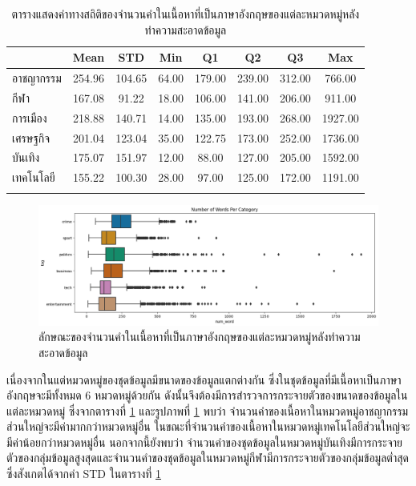 \documentclass[12pt,oneside,openright,a4paper]{cpe-thai-project}
\begin{document}
\begin{itemize}
        \begin{longtable}[!ht]{lccccccc}
          \caption{ตารางแสดงค่าทางสถิติของจำนวนคำในเนื้อหาที่เป็นภาษาอังกฤษของแต่ละหมวดหมู่หลังทําความสะอาดข้อมูล}
          \label{tbl:eng_stat}\\
          \hhline{========}
          \multicolumn{1}{c}{\textbf{หมวดหมู่}} & \textbf{Mean} & \textbf{STD} & \textbf{Min} & \textbf{Q1} & \textbf{Q2} & \textbf{Q3} & \textbf{Max}\\ \hline
          \endhead
          อาชญากรรม    & 254.96 & 104.65 & 64.00 & 179.00 & 239.00 & 312.00 & 766.00  \\ %
          กีฬา          & 167.08 & 91.22  & 18.00 & 106.00 & 141.00 & 206.00 & 911.00  \\ %
          การเมือง       & 218.88 & 140.71 & 14.00 & 135.00 & 193.00 & 268.00 & 1927.00  \\ %
          เศรษฐกิจ         & 201.04 & 123.04  & 35.00 & 122.75 & 173.00 & 252.00 & 1736.00  \\ %
          บันเทิง        & 175.07 & 151.97 & 12.00 & 88.00 & 127.00 & 205.00 & 1592.00  \\ %
          เทคโนโลยี     & 155.22 & 100.30 & 28.00 & 97.00 & 125.00 & 172.00 & 1191.00  \\ \hhline{========}
        \end{longtable}
        \begin{figure}[!ht]\centering
          \includegraphics[width=\textwidth]{./img/eng_stat/boxplot_tag.png}
          \caption{ลักษณะของจำนวนคำในเนื้อหาที่เป็นภาษาอังกฤษของแต่ละหมวดหมู่หลังทําความสะอาดข้อมูล}\label{fig:eng_boxplot}
        \end{figure}
        \newpage
        \hspace{1cm}เนื่องจากในแต่หมวดหมู่ของชุดข้อมูลมีขนาดของข้อมูลแตกต่างกัน ซึ่งในชุดข้อมูลที่มีเนื้อหาเป็นภาษาอังกฤษจะมีทั้งหมด 6 หมวดหมู่ด้วยกัน
        ดังนั้นจึงต้องมีการสำรวจการกระจายตัวของขนาดของข้อมูลในแต่ละหมวดหมู่ ซึ่งจากตารางที่ \ref{tbl:eng_stat} และรูปภาพที่ \ref{fig:eng_boxplot}
        พบว่า จำนวนคำของเนื้อหาในหมวดหมู่อาชญากรรมส่วนใหญ่จะมีค่ามากกว่าหมวดหมู่อื่น ในขณะที่จำนวนคำของเนื้อหาในหมวดหมู่เทคโนโลยีส่วนใหญ่จะมีค่าน้อยกว่าหมวดหมู่อื่น
        นอกจากนี้ยังพบว่า จำนวนคำของชุดข้อมูลในหมวดหมู่บันเทิงมีการกระจายตัวของกลุ่มข้อมูลสูงสุดและจำนวนคำของชุดข้อมูลในหมวดหมู่กีฬามีการกระจายตัวของกลุ่มข้อมูลต่ำสุด
        ซึ่งสังเกตได้จากค่า STD ในตารางที่ \ref{tbl:eng_stat}


\end{itemize}
\end{document}
